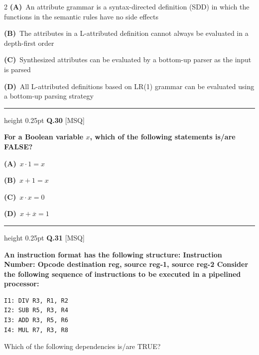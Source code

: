 \documentclass[a4paper,10pt,twoside]{article}
\begin{document}
\begin{multicols}{2}
\textbf{(A)}~An attribute grammar is a syntax-directed definition (SDD) in which the functions in the semantic rules have no side effects\par\vspace{2pt}\noindent
\textbf{(B)}~The attributes in a L-attributed definition cannot always be evaluated in a depth-first order\par\vspace{2pt}\noindent
\textbf{(C)}~Synthesized attributes can be evaluated by a bottom-up parser as the input is parsed\par\vspace{2pt}\noindent
\textbf{(D)}~All L-attributed definitions based on LR(1) grammar can be evaluated using a bottom-up parsing strategy
\par\vspace{6pt}\hrule height 0.25pt\vspace{6pt}
\noindent\textbf{Q.30} \hfill {\footnotesize\textsf{[MSQ]}}
\par\vspace{2pt}
{\bfseries For a Boolean variable $x$, which of the following statements is/are FALSE? \par}
\par\vspace{2pt}\noindent
\textbf{(A)}~$x \cdot 1 = x$\par\vspace{2pt}\noindent
\textbf{(B)}~$x + 1 = x$\par\vspace{2pt}\noindent
\textbf{(C)}~$x \cdot x = 0$\par\vspace{2pt}\noindent
\textbf{(D)}~$x + \overline{x} = 1$
\par\vspace{6pt}\hrule height 0.25pt\vspace{6pt}
\noindent\textbf{Q.31} \hfill {\footnotesize\textsf{[MSQ]}}
\par\vspace{2pt}
{\bfseries An instruction format has the following structure:
Instruction Number: Opcode destination reg, source reg-1, source reg-2
Consider the following sequence of instructions to be executed in a pipelined processor:
\begin{verbatim}
I1: DIV R3, R1, R2
I2: SUB R5, R3, R4
I3: ADD R3, R5, R6
I4: MUL R7, R3, R8
\end{verbatim}
Which of the following dependencies is/are TRUE? \par}

\end{multicols}
\end{document}
